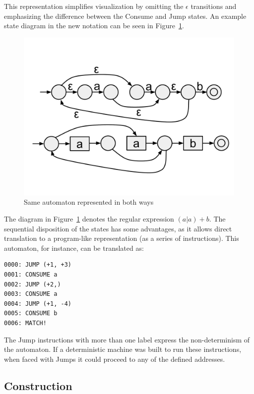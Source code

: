 \documentclass{llncs}
\begin{document}
This representation simplifies visualization by omitting the $\epsilon$ transitions and emphasizing the difference between the {\sc Consume} and {\sc Jump} states. An example state diagram in the new notation can be seen in Figure~\ref{fig:exemplo_nova_notacao}.

\begin{figure}[!htbp]
  \centering
  \includegraphics[trim=2in 2in 2in 2in, scale=0.25]{figures/new_notation_example.pdf}
  \caption{Same automaton represented in both ways}
  \label{fig:exemplo_nova_notacao}
\end{figure}

The diagram in Figure~\ref{fig:exemplo_nova_notacao} denotes the regular expression $(a|a)+b$. The sequential disposition of the states has some advantages, as it allows direct translation to a program-like representation (as a series of instructions). This automaton, for instance, can be translated as:

\nopagebreak 
\begin{verbatim}
0000: JUMP (+1, +3)
0001: CONSUME a
0002: JUMP (+2,)
0003: CONSUME a
0004: JUMP (+1, -4)
0005: CONSUME b
0006: MATCH!
\end{verbatim}

The {\sc Jump} instructions with more than one label express the non-determinism of the automaton. If a deterministic machine was built to run these instructions, when faced with {\sc Jump}s it could proceed to any of the defined addresses.

\subsection{Construction}
\end{document}
